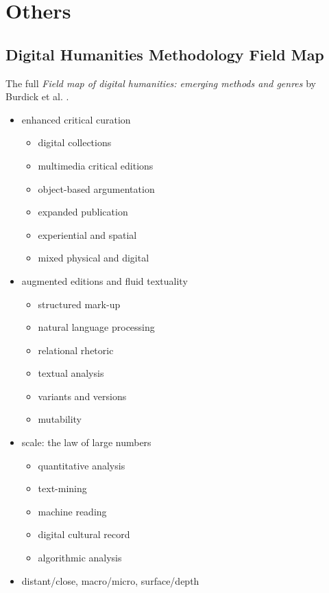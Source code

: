 
\chapter{Others}
\label{app:others}


\section{Digital Humanities Methodology Field Map}
\label{s:dhmap}

The full \textit{Field map of digital humanities: emerging methods and genres} by Burdick et al. \citeyear[p.29-60]{Burdick2012}.

\begin{itemize}
  \item enhanced critical curation
  \begin{itemize}
    \item digital collections
    \item multimedia critical editions
    \item object-based argumentation
    \item expanded publication
    \item experiential and spatial
    \item mixed physical and digital
  \end{itemize}
  \item augmented editions and fluid textuality
  \begin{itemize}
    \item structured mark-up
    \item	natural language processing
    \item	relational rhetoric
    \item	textual analysis
    \item	variants and versions
    \item	mutability
  \end{itemize}
  \item scale: the law of large numbers
  \begin{itemize}
    \item quantitative analysis
    \item	text-mining
    \item	machine reading
    \item	digital cultural record
    \item	algorithmic analysis
  \end{itemize}
  \item distant/close, macro/micro, surface/depth

\end{itemize}
